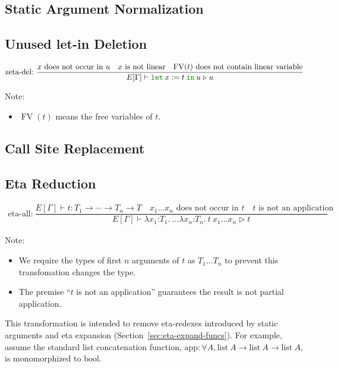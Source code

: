 \documentclass[a4paper,fleqn]{article}
\newcommand{\kwlet}{\mbox{\color{mygreen}\ttfamily let}}
\newcommand{\kwin}{\mbox{\color{mygreen}\ttfamily in}}
\newcommand{\lamTB}[2]{\lambda #1\mathord{:}#2.\:}
\newcommand{\letin}[3]{\kwlet\:#1:=#2\:\kwin\:#3}
\DeclareMathOperator{\FV}{FV}
\newcommand{\secref}[1]{Section~\ref{#1}}
\newcommand{\reltri}{\mathrel{\triangleright}}
\begin{document}
\subsection{Static Argument Normalization}\label{sec:static-argument-normalization}
\subsection{Unused let-in Deletion}\label{sec:let-in-deletion}
\begin{gather*}
  \text{zeta-del:}~
    \dfrac{
      \text{$x$ does not occur in $u$} \quad \text{$x$ is not linear} \quad \text{$\FV(t)$ does not contain linear variable}
    }{E[\Gamma] \vdash \letin{x}{t}{u}
                       \reltri
                       u
    }
\end{gather*}
{\small Note:
\begin{itemize}
  \item $\FV(t)$ means the free variables of $t$.
\end{itemize}}

\subsection{Call Site Replacement}\label{sec:call-site-replacement}

\subsection{Eta Reduction}\label{sec:eta-reduction}

\begin{gather*}
  \text{eta-all:}~
    \dfrac{
      E[\Gamma] \vdash t : T_1 \rightarrow \cdots \rightarrow T_n \rightarrow T \quad
      \text{$x_1\ldots x_n$ does not occur in $t$} \quad
      \text{$t$ is not an application}
    }{E[\Gamma] \vdash \lamTB{x_1}{T_1}\ldots \lamTB{x_n}{T_n} t\: x_1\ldots x_n
                       \reltri
                       t
    }
\end{gather*}
{\small Note:
\begin{itemize}
  \item We require the types of first $n$ arguments of $t$ as $T_1\ldots T_n$ to prevent this transfomation changes the type.
  \item The premise ``$t$ is not an application'' guarantees the result is not partial application.
\end{itemize}}

This transformation is intended to remove eta-redexes introduced by static arguments and eta expansion (\secref{sec:eta-expand-funcs}).
For example, assume the standard list concatenation function,
$\textrm{app}: \forall A, \textrm{list}\:A \rightarrow \textrm{list}\:A \rightarrow \textrm{list}\:A$,
is monomorphized to $\textrm{bool}$.
\end{document}
